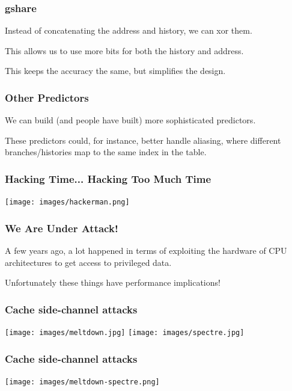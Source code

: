 \begin{frame}
\frametitle{gshare}

Instead of concatenating the address and history, we can xor them. 

This allows
us to use more bits for both the history and address. 

This keeps the accuracy the same,
but simplifies the design.


\end{frame}



\begin{frame}
\frametitle{Other Predictors}

 We can build (and people have built) more sophisticated predictors.


These predictors could, for instance, better handle aliasing, where
different branches/histories map to the same index in the table.

\end{frame}


\begin{frame}
\frametitle{Hacking Time... Hacking Too Much Time}

\begin{center}
	\texttt{[image: images/hackerman.png]}
\end{center}

\end{frame}


\begin{frame}
\frametitle{We Are Under Attack!}

A few years ago, a lot happened in terms of exploiting the hardware of CPU architectures to get access to privileged data. 

Unfortunately these things have performance implications!

\end{frame}


\begin{frame}
\frametitle{Cache side-channel attacks}

\begin{center}
\texttt{[image: images/meltdown.jpg]}
\texttt{[image: images/spectre.jpg]}
\end{center}

\end{frame}



\begin{frame}
\frametitle{Cache side-channel attacks}

\begin{center}
\texttt{[image: images/meltdown-spectre.png]}
\end{center}


\end{frame}

